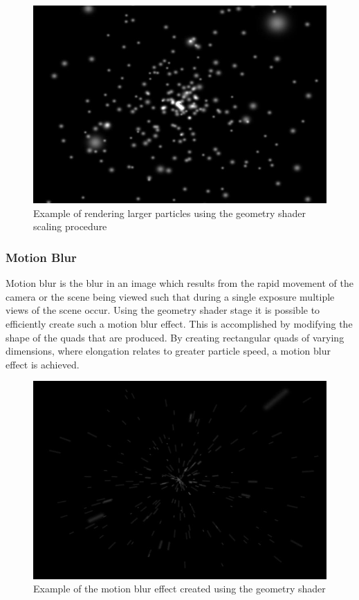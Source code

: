 \documentclass{article}
\begin{document}
\begin{figure}[h!]
	\centering
	\includegraphics[scale=0.5]{Images/FuryLargePoints}
	\caption{Example of rendering larger particles using the geometry shader scaling procedure}
\end{figure}

\subsubsection{Motion Blur}

Motion blur is the blur in an image which results from the rapid movement of the camera or the scene being viewed such that during a single exposure multiple views of the scene occur. Using the geometry shader stage it is possible to efficiently create such a motion blur effect. This is accomplished by modifying the shape of the quads that are produced. By creating rectangular quads of varying dimensions, where elongation relates to greater particle speed, a motion blur effect is achieved.

\begin{figure}[h!]
	\centering
	\includegraphics[scale=0.5]{Images/FuryMotionBlur}
	\caption{Example of the motion blur effect created using the geometry shader}
\end{figure}
\end{document}
